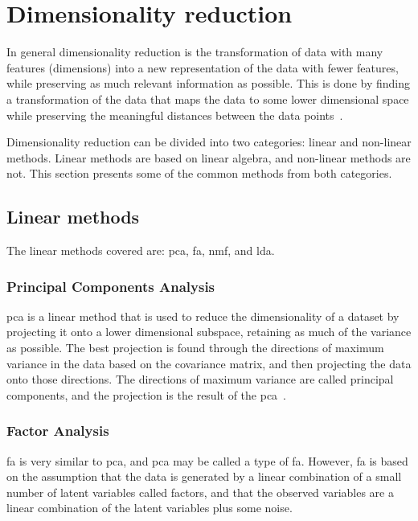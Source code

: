\section{Dimensionality reduction}\label{sec:dimensionality-reduction}
In general dimensionality reduction is the transformation of data with many features (dimensions) into a new representation of the data with fewer features, while preserving as much relevant information as possible. This is done by finding a transformation of the data that maps the data to some lower dimensional space while preserving the meaningful distances between the data points~\cite{dimensionality-reduction-comparative-review}.

Dimensionality reduction can be divided into two categories: linear and non-linear methods. Linear methods are based on linear algebra, and non-linear methods are not. This section presents some of the common methods from both categories.


\subsection{Linear methods}\label{subsec:linear-methods}
The linear methods covered are: \gls{pca}, \gls{fa}, \gls{nmf}, and \gls{lda}.


\subsubsection{Principal Components Analysis}\label{subsubsec:principal-components-analysis}
\gls{pca} is a linear method that is used to reduce the dimensionality of a dataset by projecting it onto a lower dimensional subspace, retaining as much of the variance as possible. The best projection is found through the directions of maximum variance in the data based on the covariance matrix, and then projecting the data onto those directions. The directions of maximum variance are called principal components, and the projection is the result of the \gls{pca}~\cite{dimensionality-reduction-comparative-review}.


\subsubsection{Factor Analysis}\label{subsubsec:factor-analysis}
\gls{fa} is very similar to \gls{pca}, and \gls{pca} may be called a type of \gls{fa}. However, \gls{fa} is based on the assumption that the data is generated by a linear combination of a small number of latent variables called factors, and that the observed variables are a linear combination of the latent variables plus some noise.

